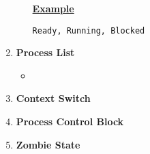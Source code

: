\documentclass[12pt]{article}
\begin{document}
\begin{mdframed}
\begin{enumerate}[1.]
\begin{itemize}
        \bigskip

        \underline{\textbf{Example}}

        \bigskip

        \texttt{Ready, Running, Blocked}
    \end{itemize}
    \item \textbf{Process List}
    \begin{itemize}
        \item
    \end{itemize}
    \item \textbf{Context Switch}
    \item \textbf{Process Control Block}
    \item \textbf{Zombie State}
\end{enumerate}

\end{mdframed}
\end{document}
